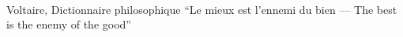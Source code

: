 \pagestyle{empty}
\begin{fullwidth}
    ~\vfill
    \begin{center}
        \large
        \begin{minipage}{0.5\linewidth}
            \begin{epigram}{Voltaire, Dictionnaire philosophique}
                \enquote{Le mieux est l'ennemi du bien --- The best is the enemy of the good}
            \end{epigram}
        \end{minipage}
    \end{center}
    ~\vfill
\end{fullwidth}
